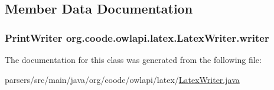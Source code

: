 \subsection{Member Data Documentation}
\hypertarget{classorg_1_1coode_1_1owlapi_1_1latex_1_1_latex_writer_a0964511bf488ab61195f568cec16de25}{
\subsubsection[{writer}]{\setlength{\rightskip}{0pt plus 5cm}Print\-Writer org.\-coode.\-owlapi.\-latex.\-Latex\-Writer.\-writer\hspace{0.3cm}{\ttfamily [private]}}}\label{classorg_1_1coode_1_1owlapi_1_1latex_1_1_latex_writer_a0964511bf488ab61195f568cec16de25}


The documentation for this class was generated from the following file\-:\begin{DoxyCompactItemize}
\item 
parsers/src/main/java/org/coode/owlapi/latex/\hyperlink{_latex_writer_8java}{Latex\-Writer.\-java}\end{DoxyCompactItemize}
